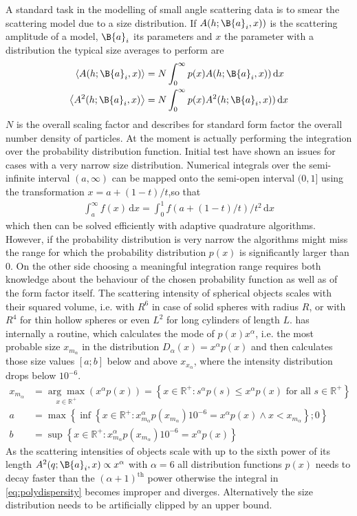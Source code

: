 A standard task in the modelling of small angle scattering data is to smear the scattering model due to a size distribution.
If $A(h;\B{a}_i,x))$ is the scattering amplitude of a model, $\B{a}_i$ its parameters and $x$ the parameter with a distribution the typical size averages to perform are
\begin{align}\label{eq:avgSAS}
  \left\langle A(h;\B{a}_i,x)\right\rangle & = N \int_0^\infty p(x) A(h;\B{a}_i,x))\, \mathrm{d}x \\
  \left\langle A^2(h;\B{a}_i,x)\right\rangle & = N \int_0^\infty p(x) A^2(h;\B{a}_i,x))\, \mathrm{d}x  \label{eq:polydispersity}
\end{align}
$N$ is the overall scaling factor and describes for standard form factor the overall number density of particles. At the moment \SASfit is actually performing the integration over the probability distribution function. Initial test have shown an issues for cases with a very narrow size distribution. Numerical integrals over the semi-infinite interval $(a,\infty)$ can be mapped onto the semi-open interval $(0,1]$ using the transformation $x = a + (1-t)/t$,so that
\begin{align}
\int_{a}^{\infty}  f(x) \, \mathrm{d}x= \int_0^1  f(a + (1-t)/t)/t^2 \, \mathrm{d}x
\end{align}
which then can be solved efficiently with adaptive quadrature algorithms. However, if the probability distribution is very narrow the algorithms might miss the range for which the probability distribution $p(x)$ is significantly larger than 0.
On the other side choosing a meaningful integration range requires both knowledge about the behaviour of the chosen probability function as well as of the form factor itself. The scattering intensity of spherical objects scales with their squared volume, i.e. with $R^6$ in case of solid spheres with radius $R$, or with $R^4$ for thin hollow spheres or even $L^2$ for long cylinders of length $L$. \SASfit has internally a routine, which calculates the mode of $p(x)x^\alpha$, i.e. the most probable size $x_{m_\alpha}$ in the distribution $D_\alpha(x)=x^\alpha p(x)$ and then calculates those size values $[a;b]$ below and above $x_{x_\alpha}$, where the intensity distribution drops below $10^{-6}$.
\begin{align}\label{eq:findintegrationrange}
x_{m_\alpha} &= \underset{x\in \mathbb{R}^+}{\arg\max} \left(x^\alpha p(x)\right)=\left\{x\in\mathbb{R}^+: s^\alpha p(s) \leq x^\alpha p(x) \mbox{ for all } s\in \mathbb{R}^+\right\} \\
  a &= \max\left\{\inf\left\{x\in \mathbb{R}^+:x_{m_\alpha}^\alpha p(x_{m_\alpha})10^{-6}=x^\alpha p(x) \wedge x<x_{m_\alpha}\right\};0\right\}\\
  b &= \sup\left\{x\in \mathbb{R}^+:x_{m_\alpha}^\alpha p(x_{m_\alpha})10^{-6}=x^\alpha p(x)\right\}
\end{align}
As the scattering intensities of objects scale with up to the sixth power of its length $A^2(q;\B{a}_i,x) \propto x^\alpha$ with $\alpha=6$ all distribution functions $p(x)$ needs to decay faster than the $(\alpha+1)^\mathrm{th}$ power otherwise the integral in \ref{eq:polydispersity} becomes improper and diverges. Alternatively the size distribution needs to be artificially clipped by an upper bound.

